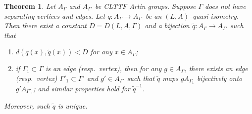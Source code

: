 \documentclass[11pt]{amsart}
\newtheorem{theorem}{Theorem}[section]
\theoremstyle{definition}
\begin{document}
\begin{theorem}
	\label{thm:CLTTF1}
Let $A_\Gamma$ and $A_{\Gamma'}$ be CLTTF Artin groups. Suppose $\Gamma$ does not have separating vertices and edges. Let $q\colon A_\Gamma\to A_{\Gamma'}$ be an $(L,A)$--quasi-isometry. Then there exist a constant $D=D(L,A,\Gamma)$ and a bijection $\tilde q\colon  A_\Gamma\to A_{\Gamma'}$ such that
\begin{enumerate}
	\item $d(q(x),\tilde q(x))<D$ for any $x\in A_\Gamma$;
	\item if $\Gamma_1\subset\Gamma$ is an edge (resp.\ vertex), then for any $g\in A_\Gamma$, there exists an edge (resp.\ vertex) $\Gamma'_1\subset\Gamma'$ and $g'\in A_{\Gamma'}$ such that $\tilde q$ maps $g A_{\Gamma_1}$ bijectively onto $g'A_{\Gamma'_1}$; and similar properties hold for $\tilde q^{-1}$.
\end{enumerate}
Moreover, such $\tilde q$ is unique.
\end{theorem}
\end{document}
